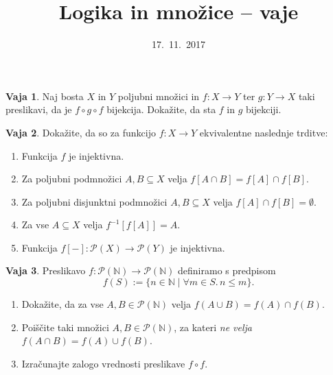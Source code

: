 \documentclass{article}
\newcommand{\NN}{\mathbb{N}}
\theoremstyle{definition}
\newtheorem{vaja}{Vaja}
\begin{document}
\title{Logika in množice -- vaje}
\date{17.~11.~2017}
\maketitle

\begin{vaja}
  Naj bosta $X$ in $Y$ poljubni množici in $f\colon X \to Y$ ter $g\colon Y \to X$ taki preslikavi, da je $f \circ g \circ f$ bijekcija. Dokažite, da sta $f$ in $g$ bijekciji.
\end{vaja}

\begin{vaja}
  Dokažite, da so za funkcijo $f\colon X \to Y$ ekvivalentne naslednje trditve:
  \begin{enumerate}
    \item Funkcija $f$ je injektivna.
    \item Za poljubni podmnožici $A, B \subseteq X$ velja $f[A \cap B] = f[A] \cap f[B]$.
    \item Za poljubni disjunktni podmnožici $A, B \subseteq X$ velja $f[A] \cap f[B] = \emptyset$.
    \item Za vse $A \subseteq X$ velja $f^{-1}[f[A]] = A$.
    \item Funkcija $f[{-}]\colon \mathcal{P}(X) \to \mathcal{P}(Y)$ je injektivna.
  \end{enumerate}
\end{vaja}

\begin{vaja}
  Preslikavo $f\colon \mathcal{P}(\NN) \to \mathcal{P}(\NN)$ definiramo s predpisom
  \[f(S) := \{n \in \mathbb{N} \mid \forall m \in S.\, n \leq m\}.\]
  \begin{enumerate}
    \item Dokažite, da za vse $A, B \in \mathcal{P}(\mathbb{N})$ velja $f(A \cup B) = f(A) \cap f(B)$.
    \item Poiščite taki množici $A, B \in \mathcal{P}(\mathbb{N})$, za kateri \emph{ne velja} $f(A \cap B) = f(A) \cup f(B)$.
    \item Izračunajte zalogo vrednosti preslikave $f \circ f$.
  \end{enumerate}
\end{vaja}
\end{document}
